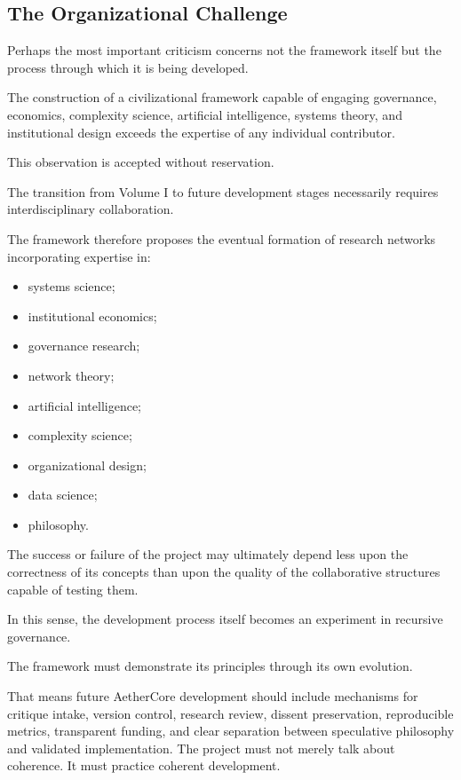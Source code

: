 \documentclass[12pt]{article}
\begin{document}
\subsection{The Organizational Challenge}

Perhaps the most important criticism concerns not the framework itself but the process through which it is being developed.

The construction of a civilizational framework capable of engaging governance, economics, complexity science, artificial intelligence, systems theory, and institutional design exceeds the expertise of any individual contributor.

This observation is accepted without reservation.

The transition from Volume I to future development stages necessarily requires interdisciplinary collaboration.

The framework therefore proposes the eventual formation of research networks incorporating expertise in:

\begin{itemize}
  \item systems science;
  \item institutional economics;
  \item governance research;
  \item network theory;
  \item artificial intelligence;
  \item complexity science;
  \item organizational design;
  \item data science;
  \item philosophy.
\end{itemize}

The success or failure of the project may ultimately depend less upon the correctness of its concepts than upon the quality of the collaborative structures capable of testing them.

In this sense, the development process itself becomes an experiment in recursive governance.

The framework must demonstrate its principles through its own evolution.

That means future AetherCore development should include mechanisms for critique intake, version control, research review, dissent preservation, reproducible metrics, transparent funding, and clear separation between speculative philosophy and validated implementation. The project must not merely talk about coherence. It must practice coherent development.
\end{document}
